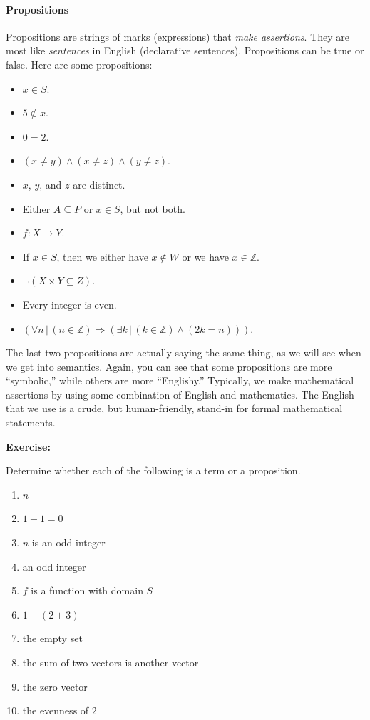 \documentclass[12pt]{article}
\def\Z{\mathbb{Z}}
\newcommand{\AND}{\wedge}
\newcommand{\ex}[1]{\textbf{Exercise:}\begin{adjustwidth}{2em}{}#1\end{adjustwidth}}
\begin{document}
\def\sp{\hspace{1em}}
\paragraph{Propositions}
Propositions are strings of marks (expressions) that \emph{make assertions}.
They are most like \emph{sentences} in English (declarative sentences).
Propositions can be true or false. 
Here are some propositions:
\begin{itemize}[label=\sp]
\item $x\in S$.
\item $5\notin x$.
\item $0=2$.
\item $(x\neq y) \AND (x\neq z) \AND (y\neq z)$.
\item $x$, $y$, and $z$ are distinct.
\item Either $A\subseteq P$ or $x\in S$, but not both.
\item $f:X\rightarrow Y$.
\item If $x\in S$, then we either have $x\notin W$ or we have $x\in\Z$.
\item $\neg(X\times Y \subseteq Z)$.
\item Every integer is even.
\item $(\forall n \, | \, (n\in\Z)\Rightarrow (\exists k\,|\,(k\in\Z)\AND(2k=n)))$.
\end{itemize}
The last two propositions are actually saying the same thing, as we will see when we get into semantics.
Again, you can see that some propositions are more ``symbolic,'' while others are more ``Englishy.''
Typically, we make mathematical assertions by using some combination of English and mathematics.
The English that we use is a crude, but human-friendly, stand-in for formal mathematical statements.



\ex{
Determine whether each of the following is a term or a proposition.
\begin{enumerate}
\item $n$
\item $1+1=0$
\item $n$ is an odd integer
\item an odd integer
\item $f$ is a function with domain $S$
\item $1+(2+3)$
\item the empty set
\item the sum of two vectors is another vector
\item the zero vector
\item the evenness of $2$ %
\end{enumerate}
}
\end{document}
